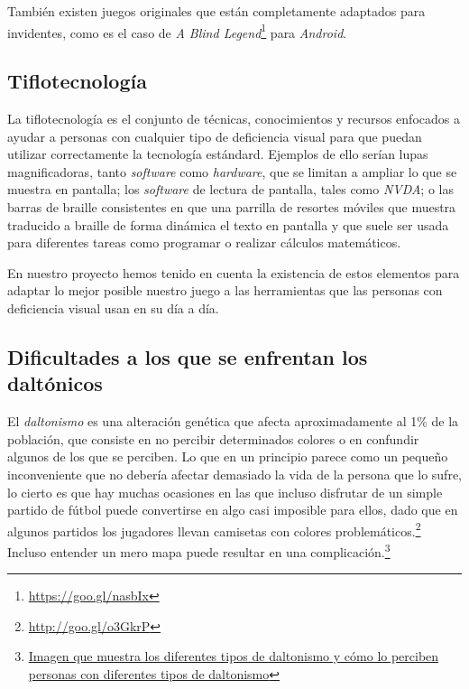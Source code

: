 También existen juegos originales que están completamente adaptados para invidentes, como es el caso de \textit{A Blind Legend}\footnote{\url{https://goo.gl/nasbIx}} para \textit{Android}.

\subsection{Tiflotecnología}

La tiflotecnología es el conjunto de técnicas, conocimientos y recursos enfocados a ayudar a personas con cualquier tipo de deficiencia visual para que puedan utilizar correctamente la tecnología estándard.\cite{Munoz_etal_2004a}\cite{Hersh_and_Johnson_2008a}
Ejemplos de ello serían lupas magnificadoras, tanto \textit{software} como \textit{hardware}, que se limitan a ampliar lo que se muestra en pantalla; los \textit{software} de lectura de pantalla, tales como \textit{NVDA}; o las barras de braille consistentes en que una parrilla de resortes móviles que muestra traducido a braille de forma dinámica el texto en pantalla y que suele ser usada para diferentes tareas como programar o realizar cálculos matemáticos.

En nuestro proyecto hemos tenido en cuenta  la existencia de estos elementos para adaptar lo mejor posible nuestro juego a las herramientas que las personas con deficiencia visual usan en su día a día.

\subsection{Dificultades a los que se enfrentan los daltónicos}

El \textit{daltonismo} es una alteración genética que afecta aproximadamente al 1\% de la población, que consiste en no percibir determinados colores o en confundir algunos de los que se perciben. Lo que en un principio parece como un pequeño inconveniente que no debería afectar demasiado la vida de la persona que lo sufre, lo cierto es que hay muchas ocasiones en las que incluso disfrutar de un simple partido de fútbol puede convertirse en algo casi imposible para ellos, dado que en algunos partidos los jugadores llevan camisetas con colores problemáticos.\footnote{\url{http://goo.gl/o3GkrP}} Incluso entender un mero mapa puede resultar en una complicación.\footnote{\href{https://i.imgur.com/CMCywUU.jpg}{Imagen que muestra los diferentes tipos de daltonismo y cómo lo perciben personas con diferentes tipos de daltonismo}}

